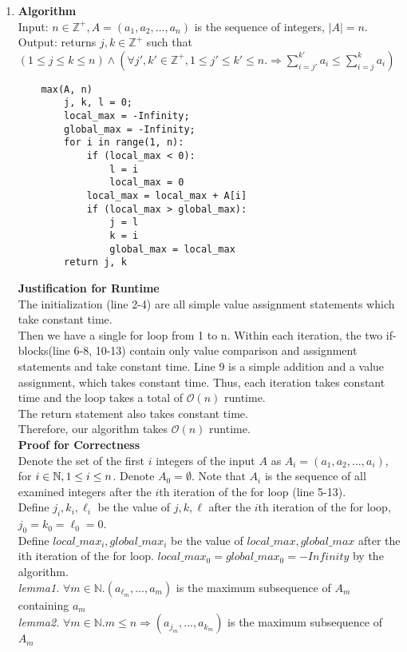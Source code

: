 \documentclass[11pt]{article}
\begin{document}
\begin{enumerate}
\begin{enumerate}
    \end{enumerate}
    \newpage
    \item \textbf{Algorithm} \\
    Input: $n \in\mathbb{Z}^+, A = (a_1,a_2,...,a_n)$ is the sequence of integers, $|A| = n$. \\
    Output: returns $j,k\in\mathbb{Z}^+$ such that $(1\leq j\leq k \leq n)\wedge (\forall j',k'\in\mathbb{Z}^+, 1 \leq j'\leq k' \leq n.\Rightarrow \sum_{i=j'}^{k'}a_i \leq \sum_{i=j}^{k}a_i)$ \\
    \begin{lstlisting}
    max(A, n)
        j, k, l = 0;
        local_max = -Infinity;
        global_max = -Infinity;
        for i in range(1, n):
            if (local_max < 0):
                l = i
                local_max = 0
            local_max = local_max + A[i]
            if (local_max > global_max):
                j = l
                k = i
                global_max = local_max
        return j, k
    \end{lstlisting}
    \textbf{Justification for Runtime}\\[2ex]
    The initialization (line 2-4) are all simple value assignment statements which take constant time.\\
    Then we have a single for loop from 1 to n. Within each iteration, the two if-blocks(line 6-8, 10-13) contain only value comparison and assignment statements and take constant time. Line 9 is a simple addition and a value assignment, which takes constant time. Thus, each iteration takes constant time and the loop takes a total of $\mathcal{O}(n)$ runtime.\\
    The return statement also takes constant time.\\
    Therefore, our algorithm takes $\mathcal{O}(n)$ runtime.\\[2ex]
    
    \textbf{Proof for Correctness} \\[2ex]
    Denote the set of the first $i$ integers of the input $A$ as $A_i = (a_1,a_2,...,a_i)$, for $i\in \mathbb N, 1\leq i \leq n$. Denote $A_0 = \emptyset$. Note that $A_i$ is the sequence of all examined integers after the $i$th iteration of the for loop (line 5-13). \\
    Define $j_i,k_i, \ell_i$ be the value of $j,k, \ell$ after the $i$th iteration of the for loop, $j_0 = k_0 = \ell_0 = 0$. \\
    Define $local\_max_i, global\_max_i$ be the value of $local\_max, global\_max$ after the ith iteration of the for loop. $local\_max_0 = global\_max_0 = -Infinity$ by the algorithm.\\[2ex]
     \textit{lemma1. }$\forall m\in\mathbb{N}. (a_{\ell_m},...,a_{m})$ is the maximum subsequence of $A_m$ containing $a_{m}$\\
    \textit{lemma2. } $\forall m\in\mathbb{N}. m\leq n\Rightarrow (a_{j_m},...,a_{k_m})$ is the maximum subsequence of $A_m$
  

\end{enumerate}
\end{document}
